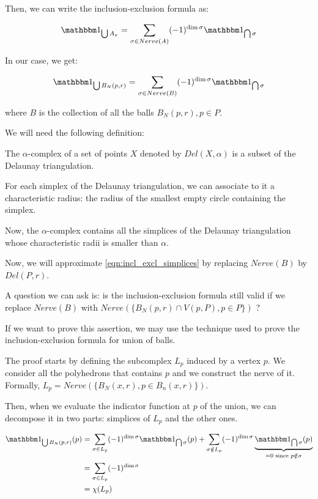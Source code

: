Then, we can write the inclusion-exclusion formula as:

$$ \indicator{\bigcup A_x} = \sum_{\sigma \in Nerve(A)} (-1)^{\dim \sigma}
\indicator{\bigcap \sigma} $$

In our case, we get:

\begin{equation}
    \indicator{\bigcup B_N(p, r)} = \sum_{\sigma \in Nerve(B)} (-1)^{\dim \sigma}
    \indicator{\bigcap \sigma}
    \label{eqn:incl_excl_simplices}
\end{equation}

where $ B $ is the collection of all the balls $ B_N(p, r), p \in P $.

We will need the following definition:
\begin{definition}
    The $\alpha$-complex of a set of points $ X $ denoted by $ Del(X, \alpha) $
    is a subset of the Delaunay triangulation.

    For each simplex of the Delaunay triangulation, we can associate to it a
    characteristic radius: the radius of the smallest empty circle containing
    the simplex.

    Now, the $\alpha$-complex contains all the simplices of the Delaunay
    triangulation whose characteristic radii is smaller than $\alpha$.
\end{definition}

Now, we will approximate \ref{eqn:incl_excl_simplices} by replacing $ Nerve(B)
$ by $ Del(P, r) $.


A question we can ask is: is the inclusion-exclusion formula still valid if we
replace $ Nerve(B) $ with $ Nerve(\{ B_N(p, r) \cap V(p, P), p \in P\}) $ ?

If we want to prove this assertion, we may use the technique used to prove the
inclusion-exclusion formula for union of balls.

The proof starts by defining the subcomplex $ L_p $ induced by a vertex $ p $.
We consider all the polyhedrons that contains $ p $ and we construct the nerve of
it. Formally, $ L_p = Nerve(\{ B_N(x, r), p \in B_n(x, r)\}) $.

Then, when we evaluate the indicator function at $ p $ of the union, we can
decompose it in two parts: simplices of $ L_p $ and the other ones.

\begin{align*}
    \indicator{\bigcup B_N(p, r)}(p) &= \sum_{\sigma \in L_p} (-1)^{\dim \sigma}
    \indicator{\bigcap \sigma}(p) + \sum_{\sigma \notin L_p} (-1)^{\dim \sigma}
    \underbrace{\indicator{\bigcap \sigma}(p)}_{= 0 \text{ since } p \notin
        \sigma} \\
    &= \sum_{\sigma \in L_p} (-1)^{\dim \sigma} \\
    &= \chi(L_p)
\end{align*}


